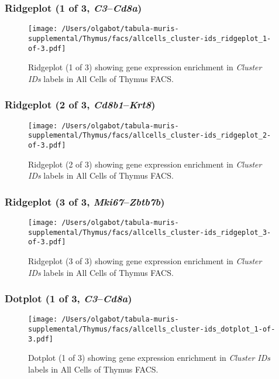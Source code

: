 \clearpage

\subsubsection{Ridgeplot (1 of 3, \emph{C3}--\emph{Cd8a})}
\begin{figure}[h]
\centering
\texttt{[image: /Users/olgabot/tabula-muris-supplemental/Thymus/facs/allcells\_cluster-ids\_ridgeplot\_1-of-3.pdf]}

\caption{ Ridgeplot (1 of 3)  showing gene expression enrichment in \emph{Cluster IDs} labels in All Cells of Thymus FACS. }
\end{figure}


\clearpage

\subsubsection{Ridgeplot (2 of 3, \emph{Cd8b1}--\emph{Krt8})}
\begin{figure}[h]
\centering
\texttt{[image: /Users/olgabot/tabula-muris-supplemental/Thymus/facs/allcells\_cluster-ids\_ridgeplot\_2-of-3.pdf]}

\caption{ Ridgeplot (2 of 3)  showing gene expression enrichment in \emph{Cluster IDs} labels in All Cells of Thymus FACS. }
\end{figure}


\clearpage

\subsubsection{Ridgeplot (3 of 3, \emph{Mki67}--\emph{Zbtb7b})}
\begin{figure}[h]
\centering
\texttt{[image: /Users/olgabot/tabula-muris-supplemental/Thymus/facs/allcells\_cluster-ids\_ridgeplot\_3-of-3.pdf]}

\caption{ Ridgeplot (3 of 3)  showing gene expression enrichment in \emph{Cluster IDs} labels in All Cells of Thymus FACS. }
\end{figure}


\clearpage

\subsubsection{Dotplot (1 of 3, \emph{C3}--\emph{Cd8a})}
\begin{figure}[h]
\centering
\texttt{[image: /Users/olgabot/tabula-muris-supplemental/Thymus/facs/allcells\_cluster-ids\_dotplot\_1-of-3.pdf]}

\caption{ Dotplot (1 of 3)  showing gene expression enrichment in \emph{Cluster IDs} labels in All Cells of Thymus FACS. }
\end{figure}


